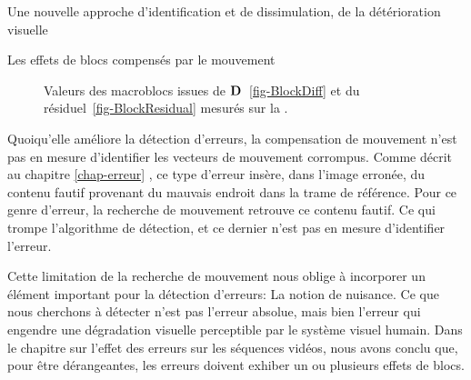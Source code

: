 \begin{chapter}{Une nouvelle approche d'identification et de dissimulation, de
la détérioration visuelle}
\begin{section}{Les effets de blocs compensés par le mouvement}
\begin{figure}
	\caption[Valeurs des macroblocs issues de $\ltD{}$ et du résiduel]{Valeurs des
macroblocs issues de $\ltD{}$~\ref{fig-BlockDiff} et du
résiduel~\ref{fig-BlockResidual} mesurés sur la .}
	\label{fig-BlockEnery}
\end{figure}

Quoiqu'elle améliore la détection d'erreurs, la compensation de mouvement n'est
pas en mesure d'identifier les vecteurs de mouvement corrompus. Comme décrit au
chapitre \ref{chap-erreur} , ce type d'erreur insère, dans
l'image erronée, du contenu fautif provenant du mauvais endroit dans la trame de
référence. Pour ce genre d'erreur, la recherche de mouvement retrouve ce contenu
fautif. Ce qui trompe l'algorithme de détection, et ce dernier n'est pas en
mesure d'identifier l'erreur.

Cette limitation de la recherche de mouvement nous oblige à incorporer un
élément important pour la détection d'erreurs: La notion de nuisance. Ce que
nous cherchons à détecter n'est pas l'erreur absolue, mais bien l'erreur qui
engendre une dégradation visuelle perceptible par le système visuel humain. Dans
le chapitre sur l'effet des erreurs sur les séquences vidéos, nous avons conclu
que, pour être dérangeantes, les erreurs doivent exhiber un ou plusieurs effets
de blocs.


\end{section}
\end{chapter}
